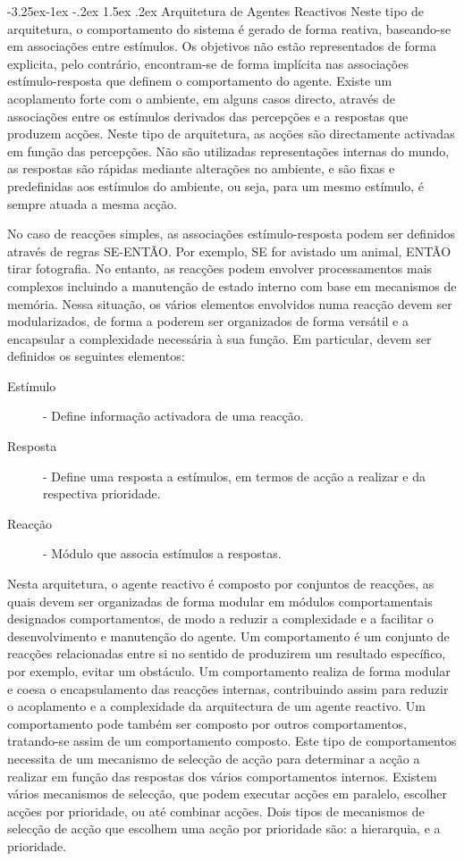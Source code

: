 \documentclass[a4paper,12pt]{article}
\makeatletter
\renewcommand\paragraph{\@startsection{paragraph}{4}{\z@}%
                {-3.25ex\@plus -1ex \@minus -.2ex}%
                {1.5ex \@plus .2ex}%
                {\normalfont\normalsize\bfseries}}
\makeatother
\begin{document}
\newpage
\paragraph{Arquitetura de Agentes Reactivos}
Neste tipo de arquitetura, o comportamento do sistema é gerado de forma reativa, baseando-se em associações entre estímulos. Os objetivos não estão representados de forma explicita, pelo contrário, encontram-se de forma implícita nas associações estímulo-resposta que definem o comportamento do agente.
Existe um acoplamento forte com o ambiente, em alguns casos directo, através de associações entre os estímulos derivados das percepções e a respostas que produzem acções.
Neste tipo de arquitetura, as acções são directamente activadas em função das percepções. Não são utilizadas representações internas do mundo, as respostas são rápidas mediante alterações no ambiente, e são fixas e predefinidas aos estímulos do ambiente, ou seja, para um mesmo estímulo, é sempre atuada a mesma acção.

No caso de reacções simples, as associações estímulo-resposta podem ser definidos através de regras SE-ENTÃO. Por exemplo, SE for avistado um animal, ENTÃO tirar fotografia.
No entanto, as reacções podem envolver processamentos mais complexos incluindo a manutenção de estado interno com base em mecanismos de memória. Nessa situação, os vários elementos envolvidos numa reacção devem ser modularizados, de forma a poderem ser organizados de forma versátil e a encapsular a complexidade necessária à sua função. Em particular, devem ser definidos os seguintes elementos:

\begin{description}
	\item[Estímulo] - Define informação activadora de uma reacção.
	\item[Resposta] - Define uma resposta a estímulos, em termos de acção a realizar e da respectiva prioridade.
	\item[Reacção] - Módulo que associa estímulos a respostas.
\end{description}

Nesta arquitetura, o agente reactivo é composto por conjuntos de reacções, as quais devem ser organizadas de forma modular em módulos comportamentais designados comportamentos, de modo a reduzir a complexidade e a facilitar o desenvolvimento e manutenção do agente. Um comportamento é um conjunto de reacções relacionadas entre si no sentido de produzirem um resultado específico, por exemplo, evitar um obstáculo.  Um comportamento realiza de forma modular e coesa o encapsulamento das reacções internas, contribuindo assim para reduzir o acoplamento e a complexidade da arquitectura de um agente reactivo.
Um comportamento pode também ser composto por outros comportamentos, tratando-se assim de um comportamento composto. Este tipo de comportamentos necessita de um mecanismo de selecção de acção para determinar a acção a realizar em função das respostas dos vários comportamentos internos.
Existem vários mecanismos de selecção, que podem executar acções em paralelo, escolher acções por prioridade, ou até combinar acções. Dois tipos de mecanismos de selecção de acção que escolhem uma acção por prioridade são: a hierarquia, e a prioridade.
\end{document}
